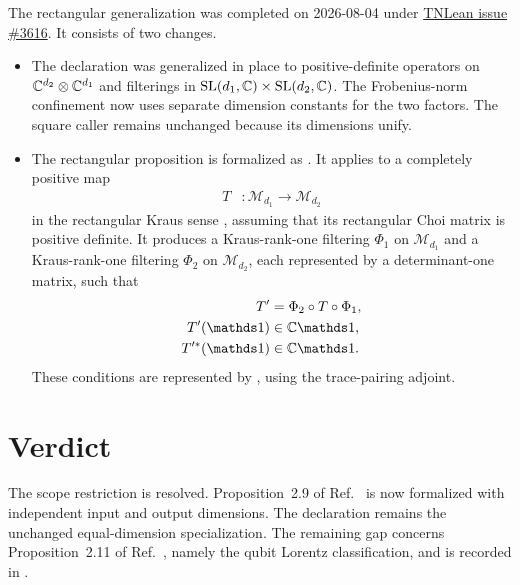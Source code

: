 \documentclass{article}
\begin{document}
The rectangular generalization was completed on 2026-08-04 under
\href{https://github.com/LionSR/TNLean/issues/3616}{TNLean issue \#3616}.
It consists of two changes.
\begin{itemize}
    \item The declaration  was generalized
    in place to positive-definite operators on
    $\mathbb{C}^{d_2}\otimes\mathbb{C}^{d_1}$ and filterings in
    $\operatorname{SL}(d_1,\mathbb{C})\times\operatorname{SL}(d_2,\mathbb{C})$. The
    Frobenius-norm confinement now uses separate dimension constants for the
    two factors. The square caller remains unchanged because its dimensions
    unify.

    \item The rectangular proposition is formalized as
    . It applies to a
    completely positive map
    \begin{align}
        T&:\mathcal{M}_{d_1}\longrightarrow\mathcal{M}_{d_2}
        \label{eq:wolf_prop28_square_case_rectangular_map}
    \end{align}
    in the rectangular Kraus sense , assuming that its
    rectangular Choi matrix  is positive
    definite. It produces a Kraus-rank-one filtering $\Phi_1$ on
    $\mathcal{M}_{d_1}$ and a Kraus-rank-one filtering $\Phi_2$ on
    $\mathcal{M}_{d_2}$, each represented by a determinant-one matrix, such
    that
    \begin{align}
        T'&=\Phi_2\circ T\circ\Phi_1,
        \label{eq:wolf_prop28_square_case_rectangular_filtered_map}\\
        T'(\one)&\in\C\one,
        \label{eq:wolf_prop28_square_case_rectangular_output_identity}\\
        T'^{*}(\one)&\in\C\one.
        \label{eq:wolf_prop28_square_case_rectangular_adjoint_identity}
    \end{align}
    These conditions are represented by
    , using the trace-pairing adjoint.
\end{itemize}

\section{Verdict}

The scope restriction is resolved. Proposition~2.9 of
Ref.~\cite{Wolf2012Quantum} is now formalized with independent input and
output dimensions. The declaration
 remains the unchanged
equal-dimension specialization. The remaining gap concerns Proposition~2.11
of Ref.~\cite{Wolf2012Quantum}, namely the qubit Lorentz classification, and
is recorded in
.



\end{document}
